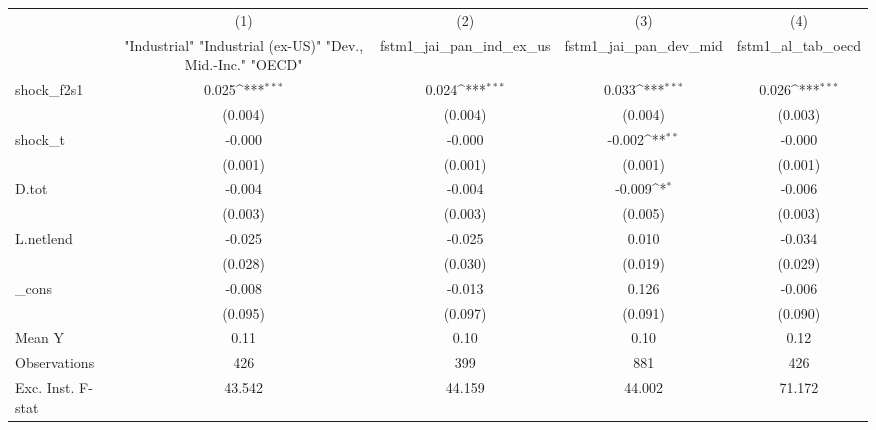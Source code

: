 {
\def\sym#1{\ifmmode^{#1}\else\(^{#1}\)\fi}
\begin{tabular}{l*{4}{c}}
\toprule
            &\multicolumn{1}{c}{(1)}&\multicolumn{1}{c}{(2)}&\multicolumn{1}{c}{(3)}&\multicolumn{1}{c}{(4)}\\
            &\multicolumn{1}{c}{ "Industrial" "Industrial (ex-US)" "Dev., Mid.-Inc." "OECD" }&\multicolumn{1}{c}{fstm1\_jai\_pan\_ind\_ex\_us}&\multicolumn{1}{c}{fstm1\_jai\_pan\_dev\_mid}&\multicolumn{1}{c}{fstm1\_al\_tab\_oecd}\\
\midrule
shock\_f2s1  &       0.025\sym{***}&       0.024\sym{***}&       0.033\sym{***}&       0.026\sym{***}\\
            &     (0.004)         &     (0.004)         &     (0.004)         &     (0.003)         \\
\addlinespace
shock\_t     &      -0.000         &      -0.000         &      -0.002\sym{**} &      -0.000         \\
            &     (0.001)         &     (0.001)         &     (0.001)         &     (0.001)         \\
\addlinespace
D.tot       &      -0.004         &      -0.004         &      -0.009\sym{*}  &      -0.006         \\
            &     (0.003)         &     (0.003)         &     (0.005)         &     (0.003)         \\
\addlinespace
L.netlend   &      -0.025         &      -0.025         &       0.010         &      -0.034         \\
            &     (0.028)         &     (0.030)         &     (0.019)         &     (0.029)         \\
\addlinespace
\_cons      &      -0.008         &      -0.013         &       0.126         &      -0.006         \\
            &     (0.095)         &     (0.097)         &     (0.091)         &     (0.090)         \\
\midrule
Mean Y      &        0.11         &        0.10         &        0.10         &        0.12         \\
Observations&         426         &         399         &         881         &         426         \\
Exc. Inst. F-stat&      43.542         &      44.159         &      44.002         &      71.172         \\
\bottomrule
\end{tabular}
}
